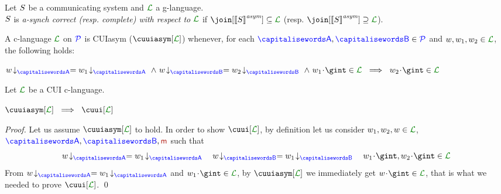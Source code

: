 \begin{definition}\label{def:cc}
  Let $S$ be a communicating system and $\clang$ a g-language.\\
  $S$ is \emph{a-synch correct (resp. complete) with respect to
    $\clang$} if $\join[{\asem{\aCS}}]\subseteq \clang$ (resp. 
  $\join[{\asem{\aCS}}]\supseteq \clang$).
\end{definition}


\begin{definition}[CUIasym]
\label{def:cuiasym}
A c-language $\clang$ on $\mathcal{\color{blue}{P}}$ is CUIasym ($\cuuiasym[\clang]$) whenever,
 for each $\p,\q\in\ptpset$ and $\acword, \acword_1, \acword_2\in\clang$, the following holds:\\
 \centerline{$\proj{\acword}{A} = \proj{\acword_1}{A}\ \land\  \proj{\acword}{B} = \proj{\acword_2}{B}\ \land\  \acword_1\cat\gint\in\clang\ \implies\ \acword_2\cat\gint\in\clang$}
\end{definition}

\begin{proposition}
Let $\clang$ be a CUI c-language.\\
\centerline{$\cuuiasym[{\clang}]\ \implies\ \cuui[\clang]$}
\end{proposition}
\begin{proof}
Let us assume $\cuuiasym[{\clang}]$ to hold. In order to show  $\cuui[{\clang}]$, 
by definition let us consider $\acword_1,\acword_2,\acword\in\clang$, $\p,\q,\msg$ such that
$$\proj{\acword}{A} =\proj{\acword_1}{A}\quad \proj{\acword}{B} =\proj{\acword_1}{B}
\quad \acword_1\cat\gint, \acword_2\cat\gint\in\clang$$
From $\proj{\acword}{A} =\proj{\acword_1}{A}$ and $\acword_1\cat\gint\in\clang$,
by $\cuuiasym[{\clang}]$ we immediately get  $\acword\cat\gint\in\clang$, that is what we needed to
prove $\cuui[\clang]$.
\qed
\end{proof}


